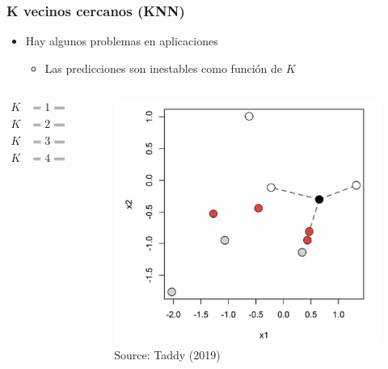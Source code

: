 \documentclass[
  shownotes,
  xcolor={svgnames},
  hyperref={colorlinks,citecolor=DarkBlue,linkcolor=DarkRed,urlcolor=DarkBlue}
  , aspectratio=169]{beamer}
\begin{document}
\begin{frame}[fragile]
\frametitle{K vecinos cercanos (KNN)}
\begin{itemize}
  \item Hay algunos problemas en aplicaciones
  \medskip
  \begin{itemize}
  \item Las predicciones son inestables como función de $K$
    \end{itemize}
\end{itemize}
  \begin{columns}[T] %
\begin{column}{.58\textwidth}
\begin{align}
  K&=1 \implies \hat{p}(white)=0 \nonumber \\
  K&=2 \implies \hat{p}(white)=1/2 \nonumber \\
  K&=3 \implies \hat{p}(white)=2/3 \nonumber \\
  K&=4 \implies \hat{p}(white)=1/2 \nonumber 
  \end{align}


\end{column}
\hfill
\begin{column}{.4\textwidth}
\begin{figure}[H] \centering
            \captionsetup{justification=centering}
              \includegraphics[scale=0.1]{figures/knn}
              \\
              \tiny
              Source: Taddy (2019)
 \end{figure}
\end{column}
\end{columns}
  
\end{frame}
\end{document}
